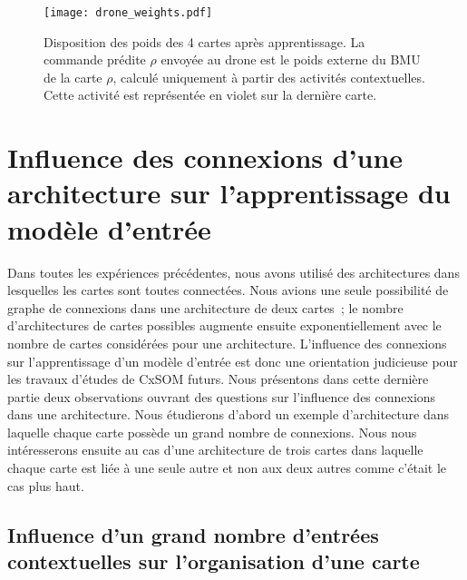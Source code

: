 \documentclass[../main]{subfiles}
\begin{document}
\begin{figure}
\texttt{[image: drone\_weights.pdf]}
\caption{Disposition des poids des 4 cartes après apprentissage. La commande prédite $\rho$ envoyée au drone est le poids externe du BMU de la carte $\rho$, calculé uniquement à partir des activités contextuelles. Cette activité est représentée en violet sur la dernière carte.}
\label{fig:drone_w}
\end{figure}

\section{Influence des connexions d'une architecture sur l'apprentissage du modèle d'entrée}

Dans toutes les expériences précédentes, nous avons utilisé des architectures dans lesquelles les cartes sont toutes connectées.
Nous avions une seule possibilité de graphe de connexions dans une architecture de deux cartes~; le nombre d'architectures de cartes possibles augmente ensuite exponentiellement avec le nombre de cartes considérées pour une architecture.
L'influence des connexions sur l'apprentissage d'un modèle d'entrée est donc une orientation judicieuse pour les travaux d'études de CxSOM futurs.
Nous présentons dans cette dernière partie deux observations ouvrant des questions sur l'influence des connexions dans une architecture.
Nous étudierons d'abord un exemple d'architecture dans laquelle chaque carte possède un grand nombre de connexions.
Nous nous intéresserons ensuite au cas d'une architecture de trois cartes dans laquelle chaque carte est liée à une seule autre et non aux deux autres comme c'était le cas plus haut.

\subsection{Influence d'un grand nombre d'entrées contextuelles sur l'organisation d'une carte}
\end{document}

